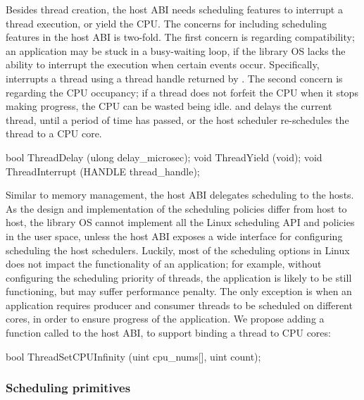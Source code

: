 Besides thread creation,
the host ABI needs scheduling features to interrupt a thread execution,
or yield the CPU.
The concerns for including scheduling features
in the host ABI
is two-fold.
The first concern is regarding compatibility;
an application may be stuck in a busy-waiting loop, if the library OS lacks the ability to interrupt the execution when certain events occur.
Specifically,  interrupts a thread using a thread handle
returned by .
The second concern is regarding the CPU occupancy;
if a thread does not forfeit the CPU when it stops making progress,
the CPU can be wasted being idle.
 and 
delays the current thread, until a period of time has passed, or the host scheduler re-schedules the thread to a CPU core.



\begin{paldef}
bool ThreadDelay     (ulong delay_microsec);
void ThreadYield     (void);
void ThreadInterrupt (HANDLE thread_handle);
\end{paldef}



Similar to memory management, the host ABI delegates scheduling to the hosts.
As the design and implementation of the scheduling policies
differ from host to host,
the library OS cannot implement all the Linux scheduling API and policies in the user space,
unless the host ABI exposes a wide interface
for configuring scheduling the host schedulers.
Luckily, most of the scheduling options in Linux does not impact
the functionality of an application;
for example, without configuring the scheduling priority of threads,
the application is likely to be still functioning,
but may suffer performance penalty.
The only exception is when an application requires
producer and consumer threads
to be scheduled on different cores,
in order to ensure progress of the application.
We propose adding a function called  to the host ABI,
to support binding a thread to CPU cores:

\begin{paldef}
bool ThreadSetCPUInfinity (uint cpu_nums[], uint count);
\end{paldef}


\subsubsection*{Scheduling primitives}


